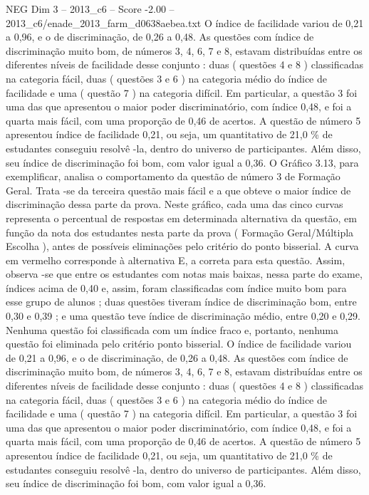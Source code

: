 \begin{textsample}{NEG Dim 3 – 2013\_c6 – Score -2.00 – 2013\_c6/enade\_2013\_farm\_d0638aebea.txt}
O índice de facilidade variou de 0,21 a 0,96, e o de discriminação, de 0,26 a 0,48.
As questões com índice de discriminação muito bom, de números 3, 4, 6, 7 e 8, estavam distribuídas entre os diferentes níveis de facilidade desse conjunto : duas ( questões 4 e 8 ) classificadas na categoria fácil, duas ( questões 3 e 6 ) na categoria médio do índice de facilidade e uma ( questão 7 ) na categoria difícil.
Em particular, a questão 3 foi uma das que apresentou o maior poder discriminatório, com índice 0,48, e foi a quarta mais fácil, com uma proporção de 0,46 de acertos.
A questão de número 5 apresentou índice de facilidade 0,21, ou seja, um quantitativo de 21,0 \% de estudantes conseguiu resolvê -la, dentro do universo de participantes.
Além disso, seu índice de discriminação foi bom, com valor igual a 0,36.
O Gráfico 3.13, para exemplificar, analisa o comportamento da questão de número 3 de Formação Geral.
Trata -se da terceira questão mais fácil e a que obteve o maior índice de discriminação dessa parte da prova.
Neste gráfico, cada uma das cinco curvas representa o percentual de respostas em determinada alternativa da questão, em função da nota dos estudantes nesta parte da prova ( Formação Geral/Múltipla Escolha ), antes de possíveis eliminações pelo critério do ponto bisserial.
A curva em vermelho corresponde à alternativa E, a correta para esta questão.
Assim, observa -se que entre os estudantes com notas mais baixas, nessa parte do exame, índices acima de 0,40 e, assim, foram classificadas com índice muito bom para esse grupo de alunos ; duas questões tiveram índice de discriminação bom, entre 0,30 e 0,39 ; e uma questão teve índice de discriminação médio, entre 0,20 e 0,29.
Nenhuma questão foi classificada com um índice fraco e, portanto, nenhuma questão foi eliminada pelo critério ponto bisserial.
O índice de facilidade variou de 0,21 a 0,96, e o de discriminação, de 0,26 a 0,48.
As questões com índice de discriminação muito bom, de números 3, 4, 6, 7 e 8, estavam distribuídas entre os diferentes níveis de facilidade desse conjunto : duas ( questões 4 e 8 ) classificadas na categoria fácil, duas ( questões 3 e 6 ) na categoria médio do índice de facilidade e uma ( questão 7 ) na categoria difícil.
Em particular, a questão 3 foi uma das que apresentou o maior poder discriminatório, com índice 0,48, e foi a quarta mais fácil, com uma proporção de 0,46 de acertos.
A questão de número 5 apresentou índice de facilidade 0,21, ou seja, um quantitativo de 21,0 \% de estudantes conseguiu resolvê -la, dentro do universo de participantes.
Além disso, seu índice de discriminação foi bom, com valor igual a 0,36.

\end{textsample}
